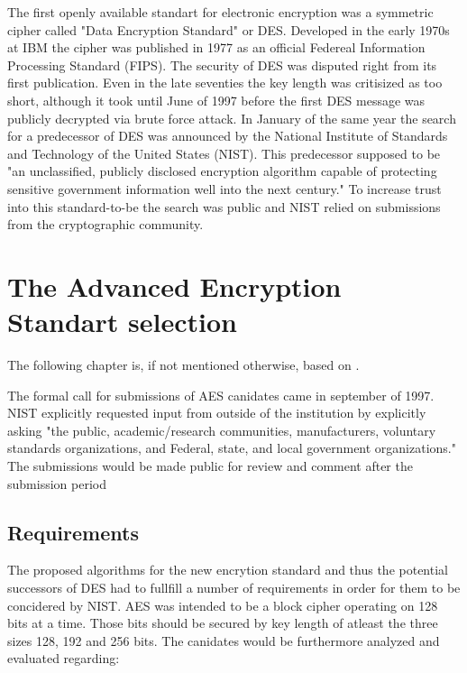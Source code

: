 The first openly available standart for electronic encryption was a symmetric cipher called "Data Encryption Standard" or DES. Developed in the early 1970s at IBM the cipher was published in 1977 as an official Federeal Information Processing Standard (FIPS). The security of DES was disputed right from its first publication. Even in the late seventies the key length was critisized as too short, although it took until June of 1997 before the first DES message was publicly decrypted via brute force attack. In January of the same year the search for a predecessor of DES was announced by the National Institute of Standards and Technology of the United States (NIST). This predecessor supposed to be "an unclassified, publicly disclosed encryption algorithm capable of protecting sensitive government information well into the next century." To increase trust into this standard-to-be the search was public and NIST relied on submissions from the cryptographic community. 


\section{The Advanced Encryption Standart selection}
\label{ch:aes-selection}

The following chapter is, if not mentioned otherwise, based on \cite{nistdevoverview}.

The formal call for submissions of AES canidates came in september of 1997. NIST explicitly requested input from outside of the institution by explicitly asking "the public, academic/research communities, manufacturers, voluntary standards organizations, and Federal, state, and local government organizations." The submissions would be made public for review and comment after the submission period

\subsection{Requirements}
\label{ch:requirements}

The proposed algorithms for the new encrytion standard and thus the
potential successors of DES had to fullfill a number of requirements \cite{announcementrequest} in
order for them to be concidered by NIST. AES was intended to be a block
cipher operating on 128 bits at a time. Those bits should be secured by
key length of atleast the three sizes 128, 192 and 256 bits. 
The canidates would be furthermore analyzed and evaluated regarding:

